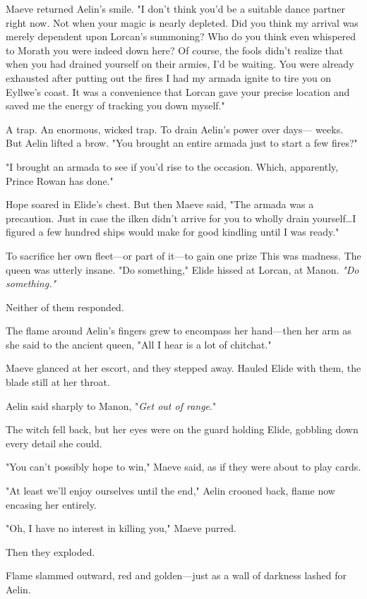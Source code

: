 Maeve returned Aelin's smile.
"I don't think you'd be a suitable dance partner right now.
Not when your magic is nearly depleted.
Did you think my arrival was merely dependent upon Lorcan's summoning?
Who do you think even whispered to Morath you were indeed down here?
Of course, the fools didn't realize that when you had drained yourself on their armies, I'd be waiting.
You were already exhausted after putting out the fires I had my armada ignite to tire you on Eyllwe's coast.
It was a convenience that Lorcan gave your precise location and saved me the energy of tracking you down myself."

A trap.
An enormous, wicked trap.
To drain Aelin's power over days--- weeks.
But Aelin lifted a brow.
"You brought an entire armada just to start a few fires?"

"I brought an armada to see if you'd rise to the occasion.
Which, apparently, Prince Rowan has done."

Hope soared in Elide's chest.
But then Maeve said, "The armada was a precaution.
Just in case the ilken didn't arrive for you to wholly drain yourself\ldots I figured a few hundred ships would make for good kindling until I was ready."

To sacrifice her own fleet---or part of it---to gain one prize 
This was madness.
The queen was utterly insane.
"Do something," Elide hissed at Lorcan, at Manon.
\emph{"Do something."}

Neither of them responded.

The flame around Aelin's fingers grew to encompass her hand---then her arm as she said to the ancient queen, "All I hear is a lot of chitchat."

Maeve glanced at her escort, and they stepped away.
Hauled Elide with them, the blade still at her throat.

Aelin said sharply to Manon, "\emph{Get out of range}."

The witch fell back, but her eyes were on the guard holding Elide, gobbling down every detail she could.

"You can't possibly hope to win," Maeve said, as if they were about to play cards.

"At least we'll enjoy ourselves until the end," Aelin crooned back, flame now encasing her entirely.

"Oh, I have no interest in killing you," Maeve purred.

Then they exploded.

Flame slammed outward, red and golden---just as a wall of darkness lashed for Aelin.

